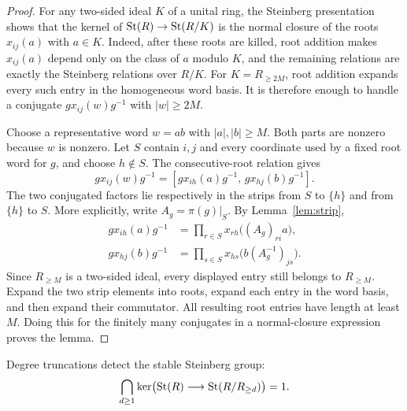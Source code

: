 \begin{proof}
For any two-sided ideal $K$ of a unital ring, the Steinberg
presentation shows that the kernel of
$\operatorname{St}(R)\to\operatorname{St}(R/K)$ is the normal closure of the roots
$x_{ij}(a)$ with $a\in K$. Indeed, after these roots are killed,
root addition makes $x_{ij}(a)$ depend only on the class of $a$
modulo $K$, and the remaining relations are exactly the
Steinberg relations over $R/K$.
For $K=R_{\ge2M}$, root addition expands every such entry in the
homogeneous word basis. It is therefore enough to handle a
conjugate $g x_{ij}(w)g^{-1}$ with $|w|\ge2M$.

Choose a representative word $w=ab$ with $|a|,|b|\ge M$.
Both parts are nonzero because $w$ is nonzero. Let $S$ contain
$i,j$ and every coordinate used by a fixed root word for $g$,
and choose $h\notin S$. The consecutive-root relation gives
\[
 g x_{ij}(w)g^{-1}
   =[g x_{ih}(a)g^{-1},\,g x_{hj}(b)g^{-1}].
\]
The two conjugated factors lie respectively in the strips from
$S$ to $\{h\}$ and from $\{h\}$ to $S$.
More explicitly, write $A_g=\pi(g)|_S$. By Lemma~\ref{lem:strip},
\begin{align*}
 g x_{ih}(a)g^{-1}
   &=\prod_{r\in S}x_{rh}\bigl((A_g)_{ri}a\bigr),\\
 g x_{hj}(b)g^{-1}
   &=\prod_{s\in S}x_{hs}\bigl(b(A_g^{-1})_{js}\bigr).
\end{align*}
Since $R_{\ge M}$ is a two-sided ideal, every displayed entry
still belongs to $R_{\ge M}$.
Expand the two strip elements into roots, expand each entry in the
word basis, and then expand their commutator. All resulting root
entries have length at least $M$. Doing this for the finitely many
conjugates in a normal-closure expression proves the lemma.
\end{proof}

\begin{theorem}\label{thm:detection}
Degree truncations detect the stable Steinberg group:
\begin{equation}\label{eq:stable-detection}
 \bigcap_{d\ge1}
 \ker\bigl(\operatorname{St}(R)\longrightarrow\operatorname{St}(R/R_{\ge d})\bigr)=1.
\end{equation}
\end{theorem}

